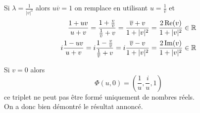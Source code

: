 \begin{enumerate}
Si $\lambda = \frac{1}{|v|^2}$ alors $u\overline{v}=1$ on remplace en utilisant $u=\frac{1}{\overline{v}}$ et
\begin{align*}
 \frac{1+uv}{u+v}=\frac{1+\frac{v}{\overline{v}}}{\frac{1}{\overline{v}}+v}
= \frac{\overline{v}+v}{1+|v|^2} = \frac{2\operatorname{Re}(v)}{1+|v|^2}\in \mathbb{R} \\
i\frac{1-uv}{u+v}=i\frac{1-\frac{v}{\overline{v}}}{\frac{1}{\overline{v}}+v}
= i\frac{\overline{v}-v}{1+|v|^2} = \frac{2\operatorname{Im}(v)}{1+|v|^2}\in \mathbb{R} 
\end{align*}

Si $v=0$ alors
\begin{displaymath}
 \Phi(u,0)=\left( \frac{1}{u},\frac{i}{u},1\right) 
\end{displaymath}
ce triplet ne peut pas être formé uniquement de nombres réels.\\
On a donc bien démontré le résultat annoncé.
\end{enumerate}
